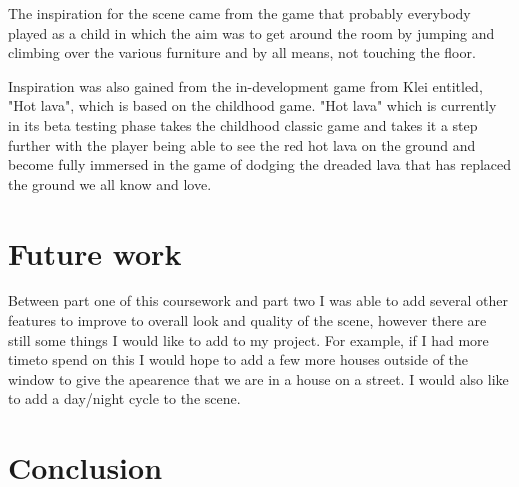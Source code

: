 \documentclass[10pt, a4paper]{article}
\begin{document}
The inspiration for the scene came from the game that
probably everybody played as a child in which the aim
was to get around the room by jumping and climbing over
the various furniture and by all means, not touching the
floor.

Inspiration was also gained from the in-development
game from Klei entitled, "Hot lava", which is based on
the childhood game. "Hot lava" which is currently in its
beta testing phase takes the childhood classic game and
takes it a step further with the player being able to see the
red hot lava on the ground and become fully immersed in
the game of dodging the dreaded lava that has replaced
the ground we all know and love.

\section{Future work}
Between part one of this coursework and part two I was able to add several other features to improve to overall look and quality of the scene, however there are still some things
I would like to add to my project. For example, if I had more timeto spend on this I would hope to add a few more houses outside of the window to give the apearence that we are in a house on a street.
I would also like to add a day/night cycle to the scene.
\section{Conclusion}	


		
\end{document}
